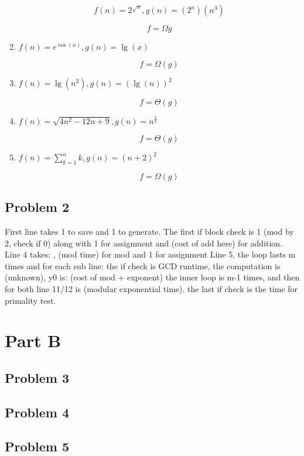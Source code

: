 \documentclass[11pt]{article}
\begin{document}
\begin{enumerate}
\[ f(n) = 2^{\sqrt{n}}, g(n) = (2^n) (n^3) \]

\[f = \Omega{g}\]

\item $f(n) = e^{\cos(x)}, g(n) = \lg(x)$

\[ f = \Omega(g) \]

\item $ f(n) = \lg(n^2), g(n) = (\lg(n))^2 $

\[ f = \Theta(g) \]

\item $ f(n) = \sqrt{4n^2 - 12n + 9}, g(n) = n^{\frac{3}{2}} $

\[ f = \Theta(g) \]

\item $ f(n) = \sum_{k = 1}^{n} k, g(n) = (n + 2)^2 $

\[ f = \Omega(g) \]

\end{enumerate}

\subsection*{Problem 2}
First line takes 1 to save and 1 to generate.
The first if block check is 1 (mod by 2, check if 0) along with 1 for assignment and (cost of add here) for addition.
Line 4 takes: , (mod time) for mod and 1 for assignment
Line 5, the loop lasts m times and for each sub line: the if check is GCD runtime, the computation is (unknown), y0 is: (cost of mod + exponent)
the inner loop is m-1 times, and then for both line 11/12 is (modular exponential time). the last if check is the time for primality test.


\section*{Part B}

\subsection*{Problem 3}

\subsection*{Problem 4}

\subsection*{Problem 5}
\end{document}
